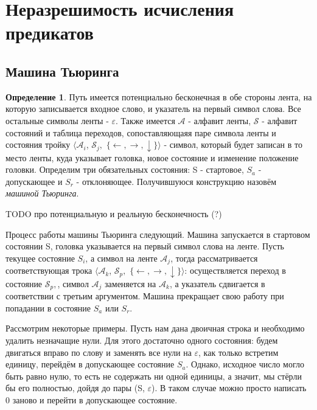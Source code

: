 \documentclass{article}
\begin{document}
\theoremstyle{definition}
\newtheorem{definition}{Определение}[section]
\newtheorem{theorem}{Теорема}[section]
\newtheorem{axiom}{Аксиома}[section]
\newtheorem{lemma}[theorem]{Лемма}

\newcommand{\gq}[1]{\texttt{<<}#1\texttt{>>}}
\newcommand{\ogq}[1]{\overline{\texttt{<<}#1\texttt{>>}}}
\newcommand{\s}[1]{\texttt{#1}}

\section{Неразрешимость исчисления предикатов}
\subsection{Машина Тьюринга}
\begin{definition} Путь имеется потенциально бесконечная в обе стороны лента, на которую записывается входное слово, и указатель на первый символ слова. Все остальные символы ленты - $\varepsilon$. Также имеется $\mathcal{A}$ - алфавит ленты, $\mathcal{S}$ - алфавит состояний и таблица переходов, сопоставляющаяя паре символа ленты и состояния тройку $\langle\mathcal{A}_i$,  $\mathcal{S}_j,$  $\lbrace \leftarrow, \rightarrow, \downarrow \rbrace\rangle$ - символ, который будет записан в то место ленты, куда указывает головка, новое состояние и изменение положение головки. Определим три обязательных состояния: S - стартовое, $S_a$ - допускающее и $S_r$ - отклоняющее. Получившуюся конструкцию назовём \textit{машиной Тьюринга}.
\end{definition}

TODO про потенциальную и реальную бесконечность (?)

Процесс работы машины Тьюринга следующий. Машина запускается в стартовом состоянии S, головка указывается на первый символ слова на ленте. Пусть текущее состояние $S_i$, а символ на ленте $\mathcal{A}_j$, тогда рассматривается соответствующая трока $\langle\mathcal{A}_k$,  $\mathcal{S}_p,$  $\lbrace \leftarrow, \rightarrow, \downarrow \rbrace\rangle$: осуществляется переход в состояние $\mathcal{S}_p,$, символ $\mathcal{A}_j$ заменяется на $\mathcal{A}_k$, а указатель сдвигается в соответствии с третьим аргументом. Машина прекращает свою работу при попадании в состояние $S_a$ или $S_r$.

Рассмотрим некоторые примеры. Пусть нам дана двоичная строка и необходимо удалить незначащие нули. Для этого достаточно одного состояния: будем двигаться вправо по слову и заменять все нули на $\varepsilon$, как только встретим единицу, перейдём в допускающее состояние $S_a$. Однако, исходное число могло быть равно нулю, то есть не содержать ни одной единицы, а значит, мы стёрли бы его полностью, дойдя до пары (S, $\varepsilon$). В таком случае можно просто написать 0 заново и перейти в допускающее состояние.
\end{document}
